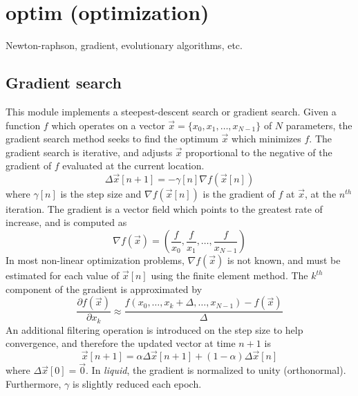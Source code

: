 \section{optim (optimization)}
Newton-raphson, gradient, evolutionary algorithms, etc.

\subsection{Gradient search}
This module implements a steepest-descent search or gradient search.
Given a function $f$ which operates on a vector
$\vec{x} = \{x_0,x_1,\ldots,x_{N-1}\}$ of $N$ parameters,
the gradient search method seeks to find the optimum $\vec{x}$ which
minimizes $f$.
The gradient search is iterative, and adjusts $\vec{x}$ proportional to the
negative of the gradient of $f$ evaluated at the current location.
\[
    \Delta \vec{x}[n+1] = -\gamma[n] \nabla f(\vec{x}[n])
\]
where $\gamma[n]$ is the step size and
$\nabla f(\vec{x}[n])$ is the gradient of $f$ at $\vec{x}$, at the $n^{th}$
iteration.
The gradient is a vector field which points to the greatest rate of increase,
and is computed as
\[
    \nabla f(\vec{x}) = \left(
        \frac{f}{x_0},
        \frac{f}{x_1},
        \ldots,
        \frac{f}{x_{N-1}}
    \right)
\]
In most non-linear optimization problems, $\nabla f(\vec{x})$ is not known,
and must be estimated for each value of $\vec{x}[n]$ using the finite element
method.
The $k^{th}$ component of the gradient is approximated by
\[
    \frac{\partial f(\vec{x})}{\partial x_k} \approx 
    \frac{f(x_0,\ldots,x_k+\Delta,\ldots,x_{N-1}) - f(\vec{x})}{\Delta}
\]
An additional filtering operation is introduced on the step size to help
convergence, and therefore the updated vector at time $n+1$ is
\[
    \vec{x}[n+1] = \alpha \Delta\vec{x}[n+1] + (1-\alpha)\Delta\vec{x}[n]
\]
where $\Delta\vec{x}[0] = \vec{0}$.
In {\it liquid}, the gradient is normalized to unity (orthonormal).
Furthermore, $\gamma$ is slightly reduced each epoch.

